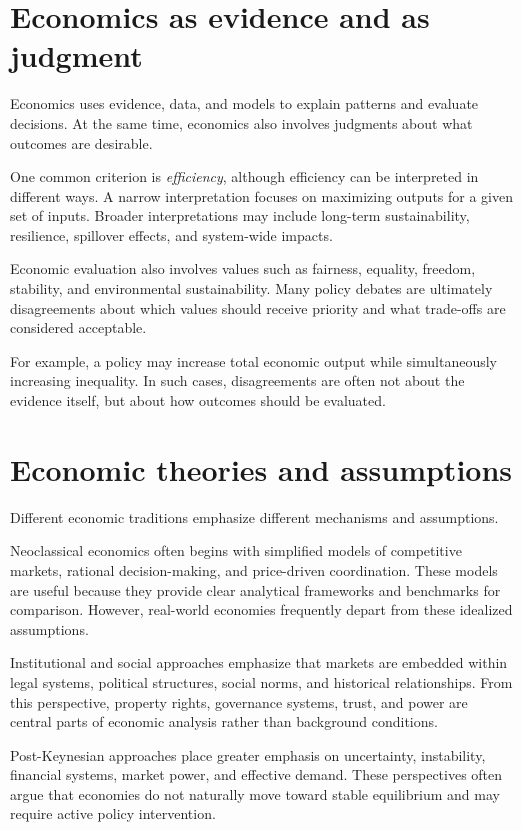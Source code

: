 \documentclass[
  11pt,
  oneside]{book}
\begin{document}
\section{Economics as evidence and as judgment}\label{economics-as-evidence-and-as-judgment}

Economics uses evidence, data, and models to explain patterns and evaluate decisions. At the same time, economics also involves judgments about what outcomes are desirable.

One common criterion is \emph{efficiency}, although efficiency can be interpreted in different ways. A narrow interpretation focuses on maximizing outputs for a given set of inputs. Broader interpretations may include long-term sustainability, resilience, spillover effects, and system-wide impacts.

Economic evaluation also involves values such as fairness, equality, freedom, stability, and environmental sustainability. Many policy debates are ultimately disagreements about which values should receive priority and what trade-offs are considered acceptable.

For example, a policy may increase total economic output while simultaneously increasing inequality. In such cases, disagreements are often not about the evidence itself, but about how outcomes should be evaluated.

\section{Economic theories and assumptions}\label{economic-theories-and-assumptions}

Different economic traditions emphasize different mechanisms and assumptions.

Neoclassical economics often begins with simplified models of competitive markets, rational decision-making, and price-driven coordination. These models are useful because they provide clear analytical frameworks and benchmarks for comparison. However, real-world economies frequently depart from these idealized assumptions.

Institutional and social approaches emphasize that markets are embedded within legal systems, political structures, social norms, and historical relationships. From this perspective, property rights, governance systems, trust, and power are central parts of economic analysis rather than background conditions.

Post-Keynesian approaches place greater emphasis on uncertainty, instability, financial systems, market power, and effective demand. These perspectives often argue that economies do not naturally move toward stable equilibrium and may require active policy intervention.
\end{document}
